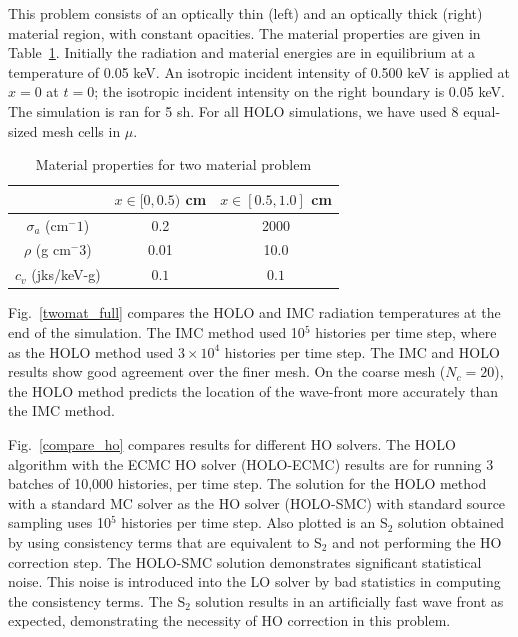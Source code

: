 \documentclass{mc2013}
\begin{document}
This problem consists of an optically thin (left) and an optically thick (right) material region,
with constant opacities.  The material properties are given in
Table~\ref{two_mat_props}.  Initially the radiation and material energies are in
equilibrium at a temperature of 0.05 keV.  An isotropic incident intensity of 0.500 keV
is applied at $x=0$ at $t=0$; the isotropic incident intensity on the right boundary is 0.05
keV.  The simulation is ran for 5 sh. For all HOLO simulations, we have used 8 equal-sized mesh cells in $\mu$.
\begin{table}[H]
        \caption{Material properties for two material problem\label{two_mat_props}}
\centering
        \begin{tabular}{|c|cc|}  \cline{2-3}
            \multicolumn{1}{c|}{}   & $x \in [0,0.5)$ cm & $x \in [0.5,1.0]$ cm   \\ \hline
            $\sigma_a$ (cm$^-1$)  & 0.2 & 2000 \\
            $\rho$ (g cm$^-3$) & 0.01 & 10.0 \\
            $c_v$ (jks/keV-g) & $0.1$ & $0.1$ \\ \hline
        \end{tabular}
\end{table}
Fig.~\ref{twomat_full} compares the HOLO and IMC radiation 
temperatures at the end of the simulation. The IMC method used 10$^5$ histories per
time step, where as the HOLO method used $3\times10^4$ histories per time step.  The
IMC and HOLO results show good agreement
over the finer mesh.
On the coarse mesh ($N_c=20$), the HOLO method predicts the location of the
wave-front more accurately than the IMC method. 

Fig.~\ref{compare_ho} compares results for different HO solvers.  The HOLO algorithm
with the ECMC HO solver (HOLO-ECMC) results
are for running 3 batches of 10,000 histories, per time step. The solution for the HOLO method with a standard MC solver as the HO solver
(HOLO-SMC) with standard source sampling uses 10$^5$ histories per time step. Also
plotted is an S$_2$ solution obtained by using consistency terms that are equivalent
to S$_2$ and not performing the HO correction step.  The HOLO-SMC solution demonstrates significant
statistical noise.  This noise is introduced into the LO solver by bad statistics in
computing the consistency terms. The S$_2$ solution results in an artificially fast
wave front as expected, demonstrating the necessity of HO correction in this problem.
\end{document}
